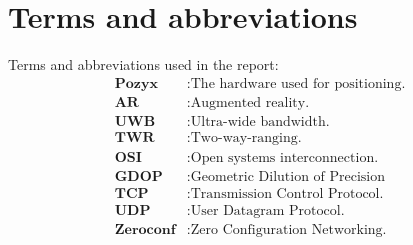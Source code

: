 \chapter*{Terms and abbreviations}
Terms and abbreviations used in the report:
\begin{align*}
    \textbf{Pozyx} &: \text{The hardware used for positioning.} \\
    \textbf{AR} &: \text{Augmented reality.} \\
    \textbf{UWB} &: \text{Ultra-wide bandwidth.} \\
    \textbf{TWR} &: \text{Two-way-ranging.} \\
    \textbf{OSI} &: \text{Open systems interconnection.} \\
    \textbf{GDOP} &: \text{Geometric Dilution of Precision} \\
    \textbf{TCP} &: \text{Transmission Control Protocol.} \\
    \textbf{UDP} &: \text{User Datagram Protocol.} \\
    \textbf{Zeroconf} &: \text{Zero Configuration Networking.} \\
\end{align*}